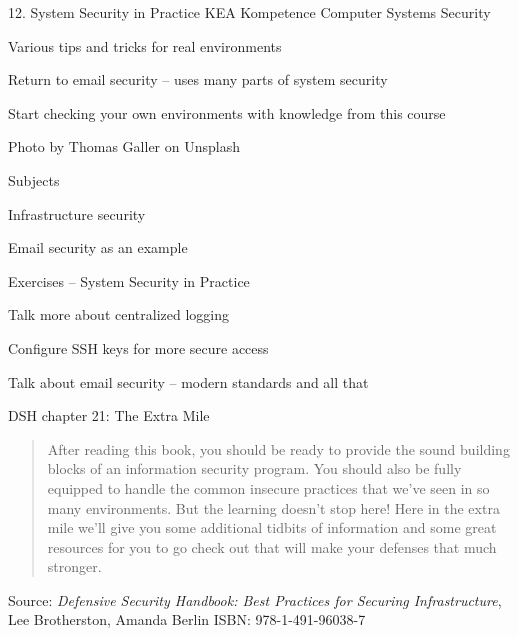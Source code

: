 \documentclass[Screen16to9,17pt]{foils}
\begin{document}
\mytitlepage
{12. System Security in Practice}
{KEA Kompetence Computer Systems Security \the\year}





\begin{list2}
\item Various tips and tricks for real environments
\item Return to email security -- uses many parts of system security
\item Start checking your own environments with knowledge from this course
\end{list2}

{\small\hfill  Photo by Thomas Galler on Unsplash}


\begin{list1}
\item Subjects
\begin{list2}
\item Infrastructure security
\item Email security as an example
\end{list2}
\item Exercises -- System Security in Practice
\begin{list2}
\item Talk more about centralized logging
\item Configure SSH keys for more secure access
\item Talk about email security -- modern standards and all that
\end{list2}
\end{list1}




DSH chapter 21: The Extra Mile
\begin{quote}
After reading this book, you should be ready to provide the sound building blocks of
an information security program. You should also be fully equipped to handle the
common insecure practices that we’ve seen in so many environments. But the learning doesn’t stop here! Here in the extra mile we’ll give you some additional tidbits of
information and some great resources for you to go check out that will make your
defenses that much stronger.
\end{quote}
Source: \emph{Defensive Security Handbook: Best Practices for Securing Infrastructure}, Lee Brotherston, Amanda Berlin ISBN: 978-1-491-96038-7
\end{document}
